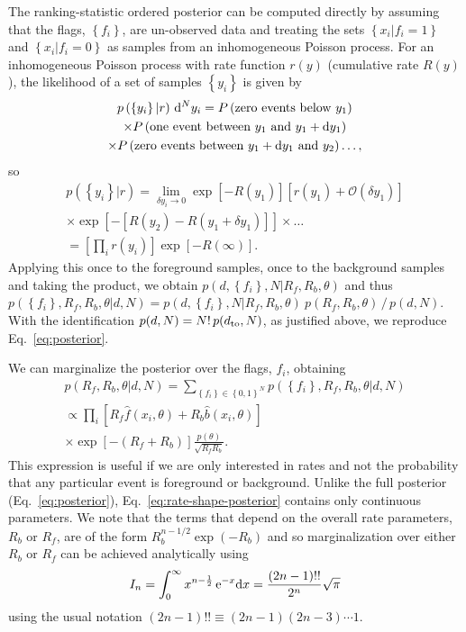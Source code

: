 \documentclass[aps,prd,reprint,nofootinbib]{revtex4-1}
\newcommand{\order}[1]{\mathcal{O}\left( #1 \right)}
\newcommand{\mathset}[1]{\left\{ #1 \right\}}
\begin{document}
The ranking-statistic ordered posterior can be computed directly by
assuming that the flags, $\mathset{f_i}$, are un-observed data and
treating the sets $\mathset{x_i | f_i = 1}$ and $\mathset{x_i | f_i =
  0}$ as samples from an inhomogeneous Poisson process.  For an
inhomogeneous Poisson process with rate function $r(y)$ (cumulative
rate $R(y)$), the likelihood of a set of samples $\mathset{y_i}$ is
given by
\begin{multline}
  p\left( \mathset{y_i} | r \right) \,{\rm d}^Ny_i = P\left(
  \textnormal{zero events below } y_1 \right) \\ \times P\left(
  \textnormal{one event between } y_1 \textnormal{ and } y_1 + {\rm
    d}y_1 \right) \\ \times P\left( \textnormal{zero events between }
  y_1+{\rm d}y_1 \textnormal{ and } y_2 \right) \ldots,
\end{multline}
so 
\begin{multline}
p\left(\mathset{y_i} | r \right) = \lim_{\delta y_i \to 0} \exp\left[ -
    R\left(y_1\right) \right] \left[ r\left( y_1 \right) +
    \order{\delta y_1} \right] \\ \times \exp\left[ - \left[ R\left( y_2
      \right) - R\left( y_1 + \delta y_1\right) \right] \right] \times
  \ldots \\ = \left[\prod_i r\left( y_i \right)\right] \exp\left[ -
    R\left( \infty \right) \right].
\end{multline}
Applying this once to the foreground samples, once to the background
samples and taking the product, we obtain $p(d,\mathset{f_i}, N | R_f,
R_b, \theta)$ and thus $p(\mathset{f_i}, R_f, R_b, \theta | d,N) =
p(d,\mathset{f_i}, N | R_f, R_b, \theta)\ p(R_f, R_b, \theta)\, /\,
p(d,N)$. With the identification $p(d,N) = N!\,p(d_{\rm to},N)$, as
justified above, we reproduce Eq.~\eqref{eq:posterior}.

We can marginalize the posterior over the flags, $f_i$, obtaining
\begin{multline}
  \label{eq:rate-shape-posterior}
  p\left( R_f, R_b, \theta | d, N \right) = \sum_{\mathset{f_i} \in
    \mathset{0,1}^N} p\left( \mathset{f_i}, R_f, R_b, \theta | d, N
  \right) \\ \propto \prod_{i} \left[ R_f \hat{f}\left(x_i, \theta\right)
    + R_b \hat{b}\left( x_i, \theta\right) \right] \\ \times \exp\left[-\left(
    R_f + R_b \right) \right] \frac{p(\theta)}{\sqrt{R_f R_b}}.
\end{multline}
This expression is useful if we are only interested in rates and not
the probability that any particular event is foreground or background.
Unlike the full posterior (Eq.~\eqref{eq:posterior}),
Eq.~\eqref{eq:rate-shape-posterior} contains only continuous
parameters. We note that the terms that depend on the overall rate
parameters, $R_b$ or $R_f$, are of the form $R_b^{n-1/2} \exp(-R_b)$
and so marginalization over either $R_b$ or $R_f$ can be achieved
analytically using
\begin{equation}
I_n = \int_0^{\infty} x^{n-\frac{1}{2}} \, {\rm e}^{-x} {\rm d} x =
\frac{(2n-1)!!}{2^n} \sqrt{\pi}
\end{equation}
using the usual notation $(2n-1)!! \equiv (2n-1)(2n-3)\cdots1$.
\end{document}
